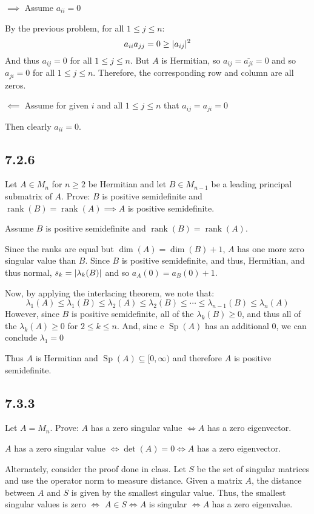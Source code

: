 \documentclass[letterpaper,12pt,fleqn]{article}
\renewcommand{\l}{\lambda}
\newcommand{\conj}[1]{\overline{#1}}
\DeclareMathOperator{\rnk}{rank}
\DeclareMathOperator{\Sp}{Sp}
\begin{document}
\begin{description}
\item $\implies$ Assume $a_{ii}=0$

  By the previous problem, for all $1\le j\le n$:
  \[a_{ii}a_{jj}=0\ge\lvert a_{ij}\rvert^2\]
  And thus $a_{ij}=0$ for all $1\le j\le n$. But $A$ is Hermitian, so
  $a_{ij}=\conj{a_{ji}}=0$ and so $a_{ji}=0$ for all $1\le j\le n$. Therefore, the
  corresponding row and column are all zeros.

\item $\impliedby$ Assume for given $i$ and all $1\le j\le n$ that $a_{ij}=a_{ji}=0$

  Then clearly $a_{ii}=0$.
\end{description}

\subsection*{7.2.6}

Let $A\in M_n$ for $n\ge2$ be Hermitian and let $B\in M_{n-1}$ be a leading principal
submatrix of $A$. Prove: $B$ is positive semidefinite and $\rnk(B)=\rnk(A) \implies A$
is positive semidefinite.

Assume $B$ is positive semidefinite and $\rnk(B)=\rnk(A)$.

Since the ranks are equal but $\dim(A)=\dim(B)+1$, $A$ has one more zero singular
value than $B$. Since $B$ is positive semidefinite, and thus, Hermitian, and thus
normal, $s_k=\abs{\l_k(B)}$ and so $a_A(0)=a_B(0)+1$.

Now, by applying the interlacing theorem, we note that:
\[\l_1(A)\le\l_1(B)\le\l_2(A)\le\l_2(B)\le\cdots\le\l_{n-1}(B)\le\l_n(A)\]
However, since $B$ is positive semidefinite, all of the $\l_k(B)\ge0$, and thus
all of the $\l_k(A)\ge0$ for $2\le k\le n$. And, sinc e $\Sp(A)$ has an additional $0$,
we can conclude $\l_1=0$

Thus $A$ is Hermitian and $\Sp(A)\subseteq[0,\infty)$ and therefore $A$ is positive
semidefinite.

\subsection*{7.3.3}

Let $A=M_n$. Prove: $A$ has a zero singular value $\iff A$ has a zero eigenvector.

$A$ has a zero singular value $\iff\det(A)=0\iff A$ has a
zero eigenvector.

Alternately, consider the proof done in class. Let $S$ be the set of singular
matrices and use the operator norm to measure distance. Given a matrix $A$, the
distance between $A$ and $S$ is given by the smallest singular value. Thus, the
smallest singular values is zero $\iff$ $A\in S\iff A$ is singular $\iff A$ has a
zero eigenvalue.
\end{document}
